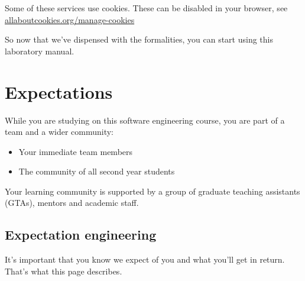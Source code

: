 \documentclass[
]{book}
\providecommand{\tightlist}{%
  \setlength{\itemsep}{0pt}\setlength{\parskip}{0pt}}
\begin{document}
Some of these services use cookies. These can be disabled in your browser, see \href{https://www.allaboutcookies.org/manage-cookies/}{allaboutcookies.org/manage-cookies}

So now that we've dispensed with the formalities, you can start using this laboratory manual.









\hypertarget{expectations}{%
\chapter*{Expectations}\label{expectations}}

While you are studying on this software engineering course, you are part of a team and a wider community:

\begin{itemize}
\tightlist
\item
  Your immediate team members
\item
  The community of all second year students
\end{itemize}

Your learning community is supported by a group of graduate teaching assistants (GTAs), mentors and academic staff.

\hypertarget{agile}{%
\section{Expectation engineering}\label{agile}}

It's important that you know we expect of you and what you'll get in return. That's what this page describes.
\end{document}
